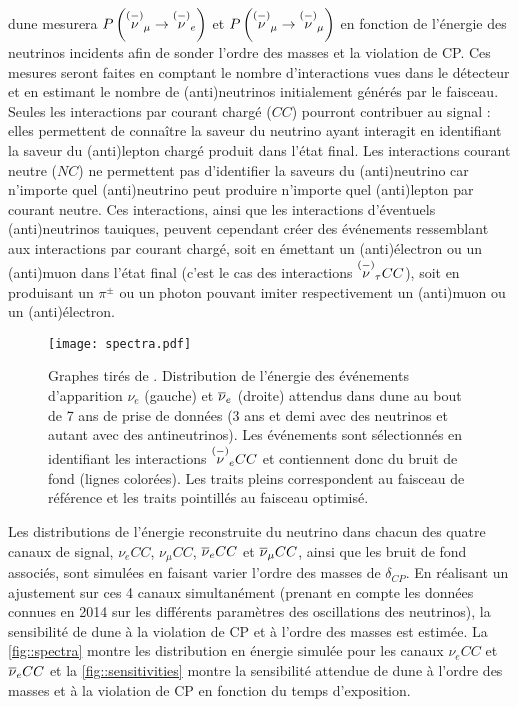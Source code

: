        \gls{dune} mesurera $P\left(\overset{(-)}{\nu}_{\mu}\to\overset{(-)}{\nu}_e\right)$ et $P\left(\overset{(-)}{\nu}_{\mu}\to\overset{(-)}{\nu}_{\mu}\right)$ en fonction de l'énergie des neutrinos incidents afin de sonder l'ordre des masses et la violation de CP. Ces mesures seront faites en comptant le nombre d'interactions vues dans le détecteur et en estimant le nombre de (anti)neutrinos initialement générés par le faisceau. Seules les interactions par courant chargé ($CC$) pourront contribuer au signal : elles permettent de connaître la saveur du neutrino ayant interagit en identifiant la saveur du (anti)lepton chargé produit dans l'état final. Les interactions courant neutre ($NC$) ne permettent pas d'identifier la saveurs du (anti)neutrino car n'importe quel (anti)neutrino peut produire n'importe quel (anti)lepton par courant neutre. Ces interactions, ainsi que les interactions d'éventuels (anti)neutrinos tauiques, peuvent cependant créer des événements ressemblant aux interactions par courant chargé, soit en émettant un (anti)électron ou un (anti)muon dans l'état final (c'est le cas des interactions $\overset{(-)}{\nu}_{\tau} CC$), soit en produisant un $\pi^{\pm}$ ou un photon pouvant imiter respectivement un (anti)muon ou un (anti)électron.

        \begin{figure}[htbp]
          \texttt{[image: spectra.pdf]}
          \caption[Distribution de l'énergie des événements attendus dans \acrshort{dune}]{\label{fig::spectra}Graphes tirés de \cite{Collaboration2015}. Distribution de l'énergie des événements d'apparition $\nu_e$ (gauche) et $\overline{\nu}_e$ (droite) attendus dans \acrshort{dune} au bout de 7 ans de prise de données (3 ans et demi avec des neutrinos et autant avec des antineutrinos). Les événements sont sélectionnés en identifiant les interactions $\overset{(-)}{\nu}_e CC$ et contiennent donc du bruit de fond (lignes colorées). Les traits pleins correspondent au faisceau de référence et les traits pointillés au faisceau optimisé.}
        \end{figure}

        Les distributions de l'énergie reconstruite du neutrino dans chacun des quatre canaux de signal, $\nu_e CC$, $\nu_{\mu} CC$, $\overline{\nu}_e CC$ et $\overline{\nu}_{\mu} CC$, ainsi que les bruit de fond associés, sont simulées en faisant varier l'ordre des masses de $\delta_{CP}$. En réalisant un ajustement sur ces 4 canaux simultanément (prenant en compte les données connues en 2014 sur les différents paramètres des oscillations des neutrinos), la sensibilité de \gls{dune} à la violation de CP et à l'ordre des masses est estimée. La \autoref{fig::spectra} montre les distribution en énergie simulée pour les canaux $\nu_e CC$ et $\overline{\nu}_e CC$ et la \autoref{fig::sensitivities} montre la sensibilité attendue de \gls{dune} à l'ordre des masses et à la violation de CP en fonction du temps d'exposition.

